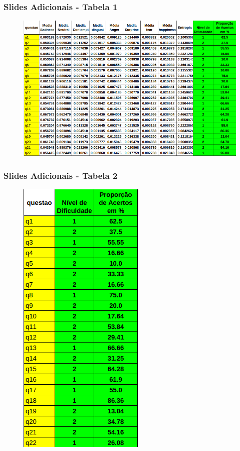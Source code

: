 \begin{frame}
\frametitle{Slides Adicionais - Tabela 1}
\begin{figure}
\centering
\includegraphics[scale=0.45]{figuras/artigosbie.png}
\end{figure}
\end{frame}

\begin{frame}
\frametitle{Slides Adicionais - Tabela 2}
\begin{figure}
\centering
\includegraphics[scale=0.45]{figuras/artigoSBIE2.png}
\end{figure}

\end{frame}


